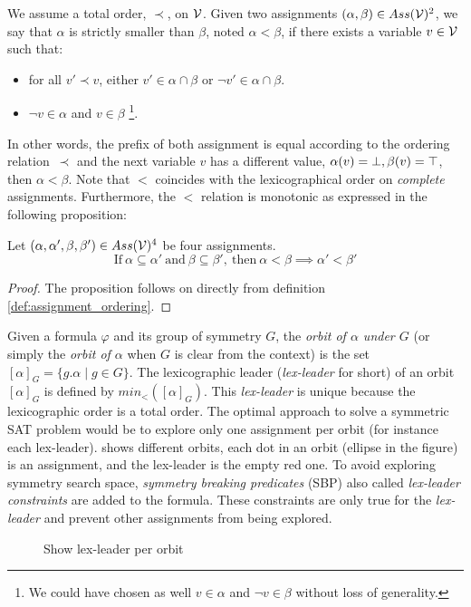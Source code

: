 \begin{definition}
 \label{def:assignment_ordering}
 We assume a total order, $\prec$, on $\mathcal{V}$.  Given two assignments $(\alpha,\beta) \in Ass(\mathcal{V})^2 $, 
 we say that $\alpha$ is strictly smaller than $\beta$, noted $\alpha < \beta$, if there exists a variable $v \in \mathcal{V}$
 such that:
 \begin{itemize}
  \item for all $v' \prec v$, either $v' \in \alpha \cap \beta$ or $\neg v' \in \alpha \cap
  \beta$.
  \item $\neg v \in \alpha$ and $v \in \beta$ \footnote{We could have chosen as well 
   $v \in \alpha$ and $\neg v \in \beta$ without loss of generality.}.
 \end{itemize}
\end{definition}

In other words, the prefix of both assignment is equal according to the ordering relation~$\prec$
and the next variable $v$ has a different value, $\alpha(v) = \bot, \beta(v) = \top$, then $\alpha < \beta$.
Note that $<$ coincides with the lexicographical order on \emph{complete}
assignments. 
Furthermore, the $<$ relation is monotonic as expressed in the following proposition:
\begin{proposition}
 \label{prop:monocity_assignments_ordering}
 Let  $(\alpha,\alpha',\beta,\beta') \in Ass(\mathcal{V})^4 $ be four assignments.
 $$\text{If}~\alpha \subseteq \alpha'~\text{and}~\beta \subseteq \beta',~\text{then}~\alpha < \beta \implies \alpha' < \beta'$$
\end{proposition}
\begin{proof}
 The proposition follows on directly from definition \ref{def:assignment_ordering}.
\end{proof}

Given a formula $\varphi$ and its group of symmetry $G$,
the \emph{orbit of $\alpha$ under $G$} (or
simply the \emph{orbit of $\alpha$} when $G$ is clear from the context) is the set
$ [\alpha]_G=\{ g.\alpha \mid g \in G \}$. 
The lexicographic leader (\textit{lex-leader} for short) of an orbit $[\alpha]_G$ is defined by
$min_<([\alpha]_G)$. This \textit{lex-leader} is unique because the lexicographic
order is a total order.
The optimal approach to solve a symmetric SAT problem would be to explore
only one assignment per orbit (for instance each lex-leader).  shows different orbits, each dot in an orbit (ellipse in the figure) is an assignment, and the lex-leader is the empty red one.
To avoid exploring 
symmetry search space, \emph{symmetry breaking predicates} (SBP) also called \emph{lex-leader constraints} 
are added to the formula.
These constraints are only true for the \emph{lex-leader} \cite{crawford1996symmetry} and prevent other assignments from being explored. 
\begin{figure}[!htbp]
 \centering
 
 \caption{Show lex-leader per orbit}
 \label{fig:lex-leader}
\end{figure}

